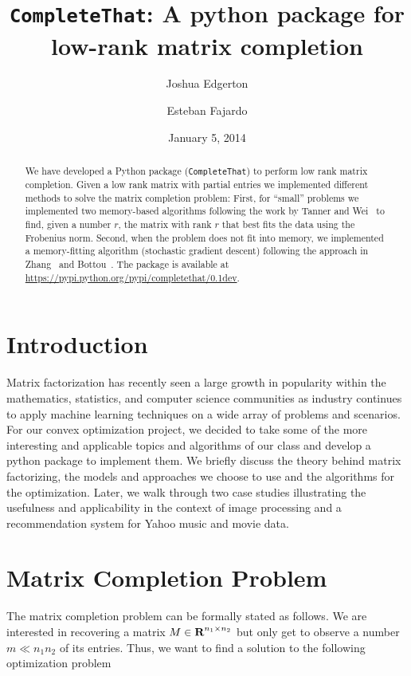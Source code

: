 \documentclass[12pt]{article}
\title{\texttt{CompleteThat}: A python package for  low-rank matrix completion}
\author{Joshua Edgerton \and Esteban Fajardo}
\date{January 5, 2014}
\begin{document}
\maketitle

\begin{abstract}
We have developed a Python package (\texttt{CompleteThat}) to perform low rank matrix completion. Given a low rank matrix with partial entries we implemented different methods to solve the matrix completion problem:  First, for ``small'' problems we implemented two memory-based algorithms  following the work by Tanner and Wei~\cite{Tanner:2014} to find, given a number $r$, the matrix with rank $r$ that best fits the data using the Frobenius norm. Second, when the problem does not fit into memory, we implemented a memory-fitting algorithm (stochastic gradient descent) following the approach in Zhang~\cite{zhang:2004} and Bottou~\cite{bottou:2012}. The package is available at \url{https://pypi.python.org/pypi/completethat/0.1dev}. 
\end{abstract}

\newpage
\tableofcontents
\newpage

\section{Introduction}
Matrix factorization has recently seen a large growth in popularity within the mathematics, statistics, and computer science communities as industry continues to apply machine learning techniques on a wide array of problems and scenarios. For our convex optimization project, we decided to take some of the more interesting and applicable topics and algorithms of our class and develop a python package to implement them. We briefly discuss the theory behind matrix factorizing, the models and approaches we choose to use and the algorithms for the optimization. Later, we walk through two case studies illustrating the usefulness and applicability in the context of image processing and a recommendation system for Yahoo music and movie data. 

\section{Matrix Completion Problem}
The matrix completion problem can be formally stated as follows. We are interested in recovering a matrix $M \in {\mbox{\bf R}}^{n_1 \times n_2}$ but only get to observe a number $m \ll n_1n_2$ of its entries. Thus, we want to find a solution to the following optimization problem
\end{document}
